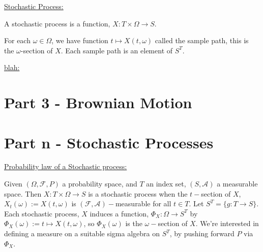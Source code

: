 \documentclass[12pt]{article}
\newcommand{\A}[0] { \mathcal{A} }
\newcommand{\F}[0] { \mathcal{F} }
\newcommand{\om}[0] { \omega }
\newcommand{\Om}[0] { \Omega }
\newcommand{\rarw}[0] { \rightarrow }
\begin{document}
\begin{flushleft}
\underline{Stochastic Process:}
\end{flushleft}

\begin{flushleft}
A stochastic process is a function, $X: T \times \Om \rarw S$.
\end{flushleft}

\begin{flushleft}
For each $\om \in \Om$, we have function $t \mapsto X(t, \om )$ called the sample path, this is the $\om$-section of $X$. Each sample path is an element of $S^T$.
\end{flushleft}

\begin{flushleft}
\underline{blah:}
\end{flushleft}




\section*{Part 3 - Brownian Motion }




\section*{Part n - Stochastic Processes }

\begin{flushleft}
\underline{Probability law of a Stochastic process:}
\end{flushleft}

\begin{flushleft}
Given $(\Omega,\F,P)$ a probability space, and $T$ an index set, $(S, \A)$ a measurable space. Then $X: T \times \Omega \rightarrow S$ is a stochastic process when the $t-$section of $X$, $X_t(\omega) := X(t,\omega)$ is $(\F,\A)-$measurable for all $t \in T$. Let $S^T = \{ g: T \rightarrow S \}$. \\
Each stochastic process, $X$ induces a function, $\Phi_X: \Omega \rightarrow S^T$ by $\Phi_X(\omega) := t \mapsto X(t,\omega)$, so $\Phi_X (\omega)$ is the $\omega-$section of $X$. We're interested in defining a measure on a suitable sigma algebra on $S^T$, by pushing forward $P$ via $\Phi_X$.
\end{flushleft}
\end{document}
